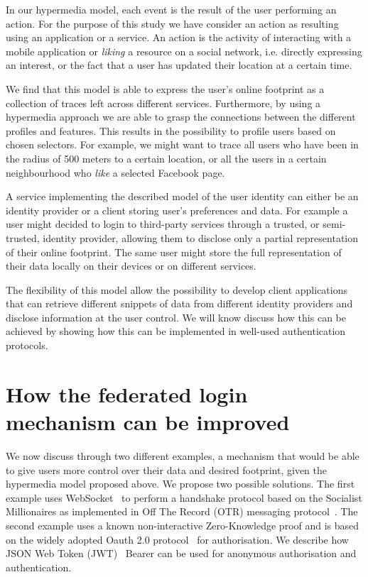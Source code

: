 In our hypermedia model, each event is the result of the user performing an action. For the purpose of this study we have consider an action as resulting using an application or a service. An action is the activity of interacting with a mobile application or \emph{liking} a resource on a social network, i.e. directly expressing an interest, or the fact that a user has updated their location at a certain time.

We find that this model is able to express the user's online footprint as a collection of traces left across different services. Furthermore, by using a hypermedia approach we are able to grasp the connections between the different profiles and features. This results in the possibility to profile users based on chosen selectors. For example, we might want to trace all users who have been in the radius of 500 meters to a certain location, or all the users in a certain neighbourhood who \emph{like} a selected Facebook page.

A service implementing the described model of the user identity can either be an identity provider or a client storing user's preferences and data. For example a user might decided to login to third-party services through a trusted, or semi-trusted, identity provider, allowing them to disclose only a partial representation of their online footprint. The same user might store the full representation of their data locally on their devices or on different services.

The flexibility of this model allow the possibility to develop client applications that can retrieve different snippets of data from different identity providers and disclose information at the user control. We will know discuss how this can be achieved by showing how this can be implemented in well-used authentication protocols.

\section{How the federated login mechanism can be improved}

We now discuss through two different examples, a mechanism that would be able to give users more control over their data and desired footprint, given the hypermedia model proposed above. We propose two possible solutions. The first example uses WebSocket~\cite{fetterfc} to perform a handshake protocol based on the Socialist Millionaires as implemented in Off The Record (OTR) messaging protocol~\cite{goldberg2012off}. The second example uses a known non-interactive Zero-Knowledge proof and is based on the widely adopted Oauth 2.0 protocol~\cite{hardt2012oauth} for authorisation. We describe how JSON Web Token (JWT)~\cite{jones2015json} Bearer can be used for anonymous authorisation and authentication.

